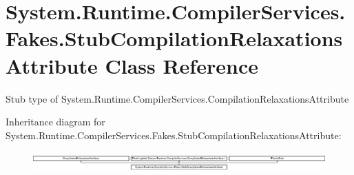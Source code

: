 \hypertarget{class_system_1_1_runtime_1_1_compiler_services_1_1_fakes_1_1_stub_compilation_relaxations_attribute}{\section{System.\-Runtime.\-Compiler\-Services.\-Fakes.\-Stub\-Compilation\-Relaxations\-Attribute Class Reference}
\label{class_system_1_1_runtime_1_1_compiler_services_1_1_fakes_1_1_stub_compilation_relaxations_attribute}
}


Stub type of System.\-Runtime.\-Compiler\-Services.\-Compilation\-Relaxations\-Attribute 


Inheritance diagram for System.\-Runtime.\-Compiler\-Services.\-Fakes.\-Stub\-Compilation\-Relaxations\-Attribute\-:\begin{figure}[H]
\begin{center}
\leavevmode
\includegraphics[height=0.774550cm]{class_system_1_1_runtime_1_1_compiler_services_1_1_fakes_1_1_stub_compilation_relaxations_attribute}
\end{center}
\end{figure}
